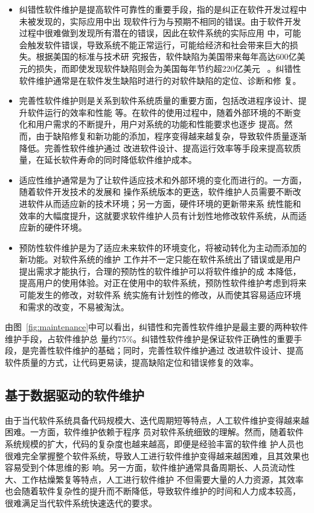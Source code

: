 \begin{itemize}
  \item 纠错性软件维护是提高软件可靠性的重要手段，指的是纠正在软件开发过程中未被发现的，实际应用中出
现软件行为与预期不相同的错误。由于软件开发过程中很难做到发现所有潜在的错误，因此在软件系统的实际应用
中，可能会触发软件错误，导致系统不能正常运行，可能给经济和社会带来巨大的损失。根据美国的标准与技术研
究报告，软件缺陷为美国带来每年高达600亿美元的损失，而即使发现软件缺陷则会为美国每年节约超220亿美元
~\cite{strate2013literature}。纠错性软件维护通常是在软件发生缺陷时进行的对软件缺陷的定位、诊断和修
复。
  \item 完善性软件维护则是关系到软件系统质量的重要方面，包括改进程序设计、提升软件运行的效率和性能
等。在软件的使用过程中，随着外部环境的不断变化和用户需求的不断提升，用户对系统的功能和性能要求也逐步
提高。然而，由于缺陷修复和新功能的添加，程序变得越来越复杂，导致软件质量逐渐降低。完善性软件维护通过
改进软件设计、提高运行效率等手段来提高软质量，在延长软件寿命的同时降低软件维护成本。
  \item 适应性维护通常是为了让软件适应技术和外部环境的变化而进行的。一方面，随着软件开发技术的发展和
操作系统版本的更迭，软件维护人员需要不断改进软件从而适应新的技术环境；另一方面，硬件环境的更新带来系
统性能和效率的大幅度提升，这就要求软件维护人员有计划性地修改软件系统，从而适应新的硬件环境。
  \item 预防性软件维护是为了适应未来软件的环境变化，将被动转化为主动而添加的新功能。对软件系统的维护
工作并不一定只能在软件系统出了错误或是用户提出需求才能执行，合理的预防性的软件维护可以将软件维护的成
本降低，提高用户的使用体验。对正在使用中的软件系统，预防性软件维护考虑到将来可能发生的修改，对软件系
统实施有计划性的修改，从而使其容易适应环境和需求的改变，不易被淘汰。
\end{itemize}

由图~\ref{fig:maintenance}中可以看出，纠错性和完善性软件维护是最主要的两种软件维护手段，占软件维护总
量约75\%。纠错性软件维护是保证软件正确性的重要手段，是完善性软件维护的基础；同时，完善性软件维护通过
改进软件设计、提高软件质量的方式，让代码更易读，提高缺陷定位和错误修复的效率。


\subsection{基于数据驱动的软件维护}
由于当代软件系统具备代码规模大、迭代周期短等特点，人工软件维护变得越来越困难。一方面，软件维护依赖于程序
员对软件系统细致的理解。然而，随着软件系统规模的扩大，代码的复杂度也越来越高，即便是经验丰富的软件维
护人员也很难完全掌握整个软件系统，导致人工进行软件维护变得越来越困难，且其效果也容易受到个体思维的影
响。另一方面，软件维护通常具备周期长、人员流动性大、工作枯燥繁复等特点，人工进行软件维护
不但需要大量的人力资源，其效率也会随着软件复杂性的提升而不断降低，导致软件维护的时间和人力成本较高，
很难满足当代软件系统快速迭代的要求。

